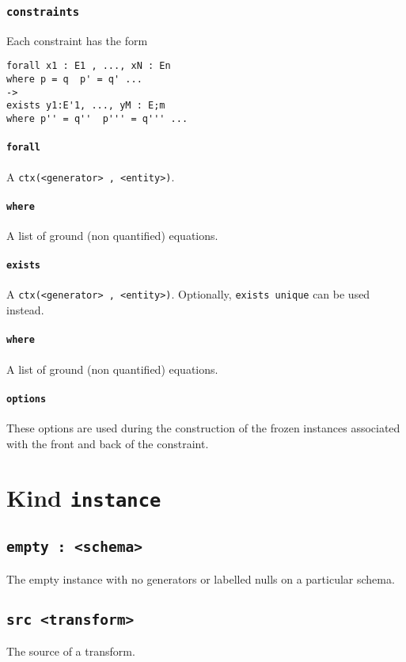 \documentclass[10pt]{book}
\begin{document}
\subsection{{\tt constraints}}
 Each constraint has the form
\begin{verbatim}
forall x1 : E1 , ..., xN : En 
where p = q  p' = q' ...
->
exists y1:E'1, ..., yM : E;m 
where p'' = q''  p''' = q''' ...
\end{verbatim}

\subsubsection{{\tt forall}}
A {\tt ctx(<generator> , <entity>)}.

\subsubsection{{\tt where}}
A list of ground (non quantified) equations.

\subsubsection{{\tt exists}}
A {\tt ctx(<generator> , <entity>)}.  Optionally, {\tt exists unique} can be used instead.

\subsubsection{{\tt where}}
A list of ground (non quantified) equations.

\subsubsection{{\tt options}}
These options are used during the construction of the frozen instances associated with the front and back of the constraint.

\chapter{Kind {\tt instance}}
\section{{\tt empty : <schema>}}
The empty instance with no generators or labelled nulls on a particular schema.

\section{{\tt src <transform>}}
The source of a transform.
\end{document}
